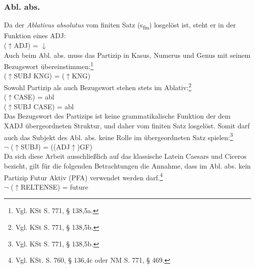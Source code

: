 \documentclass[12pt,a4paper]{article}
\begin{document}
\subsubsection{Abl. abs.}
Da der \textit{Ablativus absolutus} vom finiten Satz (s\textsubscript{fin}) losgelöst ist, steht er in der Funktion eines ADJ: \\
($\uparrow$ADJ) = $\downarrow$ \\
Auch beim Abl. abs. muss das Partizip in Kasus, Numerus und Genus mit seinem Bezugswort übereinstimmen:\footnote{Vgl. KSt S. 771, § 138,5a.}\\
($\uparrow$SUBJ KNG) = ($\uparrow$KNG)\\
Sowohl Partizip als auch Bezugswort stehen stets im Ablativ:\footnote{Vgl. KSt S. 771, § 138,5b.} \\
($\uparrow$CASE) = abl \\
($\uparrow$SUBJ CASE) = abl \\
Das Bezugswort des Partizips ist keine grammatikalische Funktion der dem XADJ übergeordneten Struktur, und daher vom finiten Satz losgelöst. Somit darf auch das Subjekt des Abl. abs. keine Rolle im übergeordneten Satz spielen:\footnote{Vgl. KSt S. 771, § 138,5b.} \\
$\neg$ ($\uparrow$SUBJ) = ((ADJ$\uparrow$)GF) \\
Da sich diese Arbeit ausschließlich auf das klassische Latein Caesars und Ciceros bezieht, gilt für die folgenden Betrachtungen die Annahme, dass im Abl. abs. kein Partizip Futur Aktiv (PFA) verwendet werden darf.\footnote{Vgl. KSt. S. 760, § 136,4c oder NM S. 771, § 469.}\\
$\neg$ ($\uparrow$RELTENSE) = future \\

\end{document}

